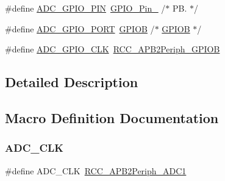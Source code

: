 \begin{DoxyCompactItemize}
\item 
\#define \mbox{\hyperlink{group___s_t_m32_f1_x_x___n_u_c_l_e_o___l_o_w___l_e_v_e_l___exported___constants_ga01de5d900ec9a1bc5ddf70ab0a6a081b}{A\+D\+C\+\_\+\+G\+P\+I\+O\+\_\+\+P\+IN}}~\mbox{\hyperlink{group___g_p_i_o__pins__define_gab305b8d1be9f89bf2b4a05589b456049}{G\+P\+I\+O\+\_\+\+Pin\+\_}}                  /$\ast$ P\+B.  $\ast$/
\item 
\#define \mbox{\hyperlink{group___s_t_m32_f1_x_x___n_u_c_l_e_o___l_o_w___l_e_v_e_l___exported___constants_ga0ef758d6de072254eaeb92726de1f257}{A\+D\+C\+\_\+\+G\+P\+I\+O\+\_\+\+P\+O\+RT}}~\mbox{\hyperlink{group___peripheral__declaration_ga68b66ac73be4c836db878a42e1fea3cd}{G\+P\+I\+OB}}                       /$\ast$ \mbox{\hyperlink{group___peripheral__declaration_ga68b66ac73be4c836db878a42e1fea3cd}{G\+P\+I\+OB}} $\ast$/
\item 
\#define \mbox{\hyperlink{group___s_t_m32_f1_x_x___n_u_c_l_e_o___l_o_w___l_e_v_e_l___exported___constants_ga5bf0185e3342668b80e394d65962bd7b}{A\+D\+C\+\_\+\+G\+P\+I\+O\+\_\+\+C\+LK}}~\mbox{\hyperlink{group___a_p_b2__peripheral_ga8c8909c3640508e9ce31dff80010a6dd}{R\+C\+C\+\_\+\+A\+P\+B2\+Periph\+\_\+\+G\+P\+I\+OB}}
\end{DoxyCompactItemize}


\subsection{Detailed Description}


\subsection{Macro Definition Documentation}
\mbox{\label{group___s_t_m32_f1_x_x___n_u_c_l_e_o___l_o_w___l_e_v_e_l___exported___constants_ga44d38ab4d4e88e679184bbbffdac00dd}} 
\subsubsection{\texorpdfstring{ADC\_CLK}{ADC\_CLK}}
{\footnotesize\ttfamily \#define A\+D\+C\+\_\+\+C\+LK~\mbox{\hyperlink{group___a_p_b2__peripheral_gacd24acb2cd5ca208652157f6c13d3145}{R\+C\+C\+\_\+\+A\+P\+B2\+Periph\+\_\+\+A\+D\+C1}}}

